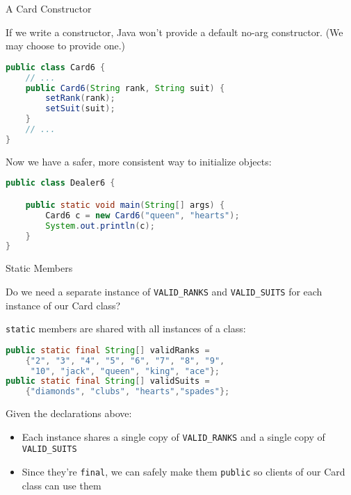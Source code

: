 \documentclass{beamer}
\begin{document}
\begin{frame}[fragile]{A Card Constructor}


If we write a constructor, Java won't provide a default no-arg constructor. (We may choose to provide one.)
\begin{lstlisting}[language=Java]
public class Card6 {
    // ...
    public Card6(String rank, String suit) {
        setRank(rank);
        setSuit(suit);
    }
    // ...
}
\end{lstlisting}

Now we have a safer, more consistent  way to initialize objects:
\begin{lstlisting}[language=Java]
public class Dealer6 {

    public static void main(String[] args) {
        Card6 c = new Card6("queen", "hearts");
        System.out.println(c);
    }
}
\end{lstlisting}

\end{frame}

\begin{frame}[fragile]{Static Members}


Do we need a separate instance of {\tt VALID\_RANKS} and {\tt VALID\_SUITS} for each instance of our Card class?

{\tt static} members are shared with all instances of a class:
\begin{lstlisting}[language=Java]
public static final String[] validRanks = 
    {"2", "3", "4", "5", "6", "7", "8", "9",
     "10", "jack", "queen", "king", "ace"};
public static final String[] validSuits =
    {"diamonds", "clubs", "hearts","spades"};
\end{lstlisting}
Given the declarations above:
\begin{itemize}
\item Each instance shares a single copy of {\tt VALID\_RANKS} and a single copy of {\tt VALID\_SUITS}
\item Since they're {\tt final}, we can safely make them {\tt public} so clients of our Card class can use them
\end{itemize}

\end{frame}
\end{document}
